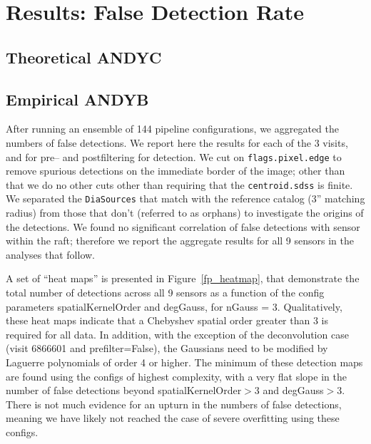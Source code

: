 \documentclass[prd, nofootinbib, floatfix, 11pt,tightenlines,times]{article}
\begin{document}
\section{Results: False Detection Rate}

\subsection{Theoretical {\bf ANDYC}\label{sec-analyticfp}}

\subsection{Empirical {\bf ANDYB}}

After running an ensemble of 144 pipeline configurations, we
aggregated the numbers of false detections.  We report here the results for
each of the 3 visits, and for pre-- and postfiltering for
detection.  We cut on {\tt flags.pixel.edge} to remove spurious
detections on the immediate border of the image; other than that we do
no other cuts other than requiring that the {\tt centroid.sdss} is
finite.  We separated the {\tt DiaSources} that match with the reference
catalog (3'' matching radius) from those that don't (referred to as
orphans) to investigate the origins of the detections.  We found no
significant correlation of false detections with sensor within the
raft; therefore we report the aggregate results for all 9 sensors in
the analyses that follow.

A set of ``heat maps'' is presented in Figure~\ref{fp_heatmap}, that
demonstrate the total number of detections across all 9 sensors as a
function of the config parameters spatialKernelOrder and degGauss, for
nGauss = 3.  Qualitatively, these heat maps indicate that a Chebyshev
spatial order greater than 3 is required for all data.  In addition,
with the exception of the deconvolution case (visit 6866601 and
prefilter=False), the Gaussians need to be modified by Laguerre
polynomials of order 4 or higher.  The minimum of these detection maps
are found using the configs of highest complexity, with a very flat
slope in the number of false detections beyond spatialKernelOrder$>$3
and degGauss$>$3.  There is not much evidence for an upturn in the
numbers of false detections, meaning we have likely not reached the
case of severe overfitting using these configs.
\end{document}
